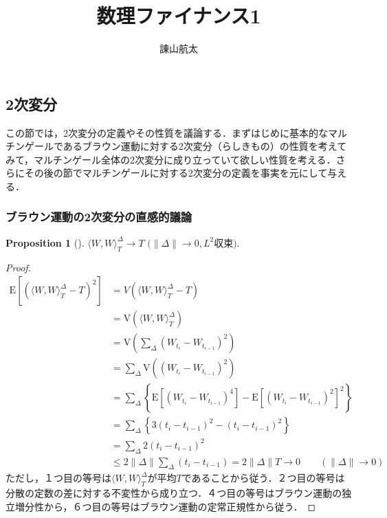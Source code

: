 \documentclass{jsarticle}
\title{数理ファイナンス1}
\author{諌山航太}
\theoremstyle{definition}
\newtheorem{prop}[dfn]{Proposition}
\begin{document}
\maketitle

\subsection{2次変分}
この節では，2次変分の定義やその性質を議論する．まずはじめに基本的なマルチンゲールであるブラウン運動に対する2次変分（らしきもの）の性質を考えてみて，マルチンゲール全体の2次変分に成り立っていて欲しい性質を考える．さらにその後の節でマルチンゲールに対する2次変分の定義を事実を元にして与える．

\subsubsection{ブラウン運動の2次変分の直感的議論}
\begin{prop}[]
    $\langle W, W \rangle_T^{\Delta} \rightarrow T$ $(\|\Delta\|\rightarrow 0, L^2$収束$)$.
\end{prop}
\begin{proof}
    \begin{align*}
        \mathrm{E}\left[\left(\langle W, W\rangle_T^{\Delta} - T\right)^2\right] &= V\left(\langle W, W\rangle_T^{\Delta} - T\right)\\
        &= \mathrm{V}\left(\langle W, W\rangle_T^{\Delta}\right)\\
        &= \mathrm{V}\left(\sum_{\Delta} (W_{t_i} - W_{t_{i-1}})^2\right)\\
        &= \sum_{\Delta} \mathrm{V}\left( (W_{t_i} - W_{t_{i-1}})^2\right)\\
        &= \sum_{\Delta} \left\{\mathrm{E}\left[(W_{t_i} - W_{t_{i-1}})^4\right] - \mathrm{E}\left[(W_{t_i} - W_{t_{i-1}})^2\right]^2\right\}\\
        &= \sum_{\Delta} \left\{3(t_i - t_{i-1})^2 - (t_i - t_{i-1})^2\right\}\\
        &= \sum_{\Delta} 2(t_i - t_{i-1})^2\\
        &\leq 2\|\Delta\| \sum_{\Delta} (t_i - t_{i-1})
        = 2\|\Delta\| T \rightarrow 0 \qquad(\|\Delta\| \rightarrow 0)
    \end{align*}
    ただし，１つ目の等号は$\langle W, W\rangle_T^{\Delta}$が平均$T$であることから従う．２つ目の等号は分散の定数の差に対する不変性から成り立つ．４つ目の等号はブラウン運動の独立増分性から，６つ目の等号はブラウン運動の定常正規性から従う．
\end{proof}
\end{document}
